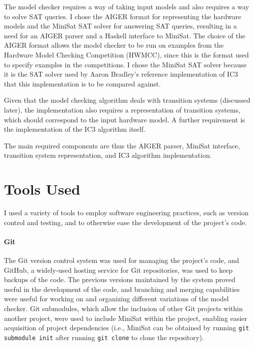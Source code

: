 \documentclass[12pt,a4paper,twoside,openright]{report}
\begin{document}

The model checker requires a way of taking input models and also
requires a way to solve SAT queries.
I chose the AIGER format for representing the hardware models and the
MiniSat SAT solver for answering SAT queries, resulting in a need for an
AIGER parser and a Haskell interface to MiniSat. The choice of
the AIGER format allows the model checker to be run on examples from
the Hardware Model Checking Competition (HWMCC), since this is the format used
to specify examples in the competitions. I chose the MiniSat SAT
solver because it is the SAT solver used by Aaron Bradley's reference
implementation of IC3 that this implementation is to be compared against.

Given that the model checking algorithm deals with transition systems
(discussed later), the implementation also requires a representation of
transition systems, which should correspond to the input hardware model.
A further requirement is the implementation of the
IC3 algorithm itself.

The main required components are thus the AIGER parser, MiniSat interface,
transition system representation, and IC3 algorithm implementation.

\section{Tools Used}

I used a variety of tools to employ software engineering practices, such
as version control and testing, and to otherwise ease the development of
the project's code.

\paragraph{Git}{
The Git version control system was used for managing the project's code, and
GitHub, a widely-used hosting service for Git repositories, was used to
keep backups of the code.
The previous versions maintained by the system proved useful in
the development of the code, and branching and merging capabilities were
useful for working on and organizing different variations of the model checker.
Git submodules, which allow the inclusion of other Git projects within another
project, were used to include MiniSat within the project, enabling easier
acquisition of project dependencies (i.e., MiniSat can be obtained by running
\verb,git submodule init, after running \verb,git clone, to clone the repository).}
\end{document}

